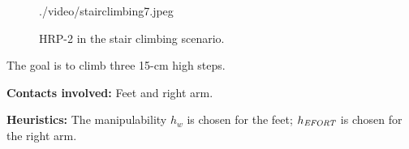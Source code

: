 \begin{figure}[h!t!]
\begin{center}
    {./video/stairclimbing7.jpeg}
  \caption{
           HRP-2 in the stair climbing scenario. }
		   \label{fig:stair_robust}
  \end{center}
  \vspace{-0.5cm}
\end{figure}


The goal is to climb three 15-cm high steps.

\noindent\textbf{Contacts involved:} Feet and right arm.

\noindent\textbf{Heuristics:} The manipulability $h_w$ is chosen for the feet; $h_{\textrm{\it EFORT}}$ is chosen for the right arm.



